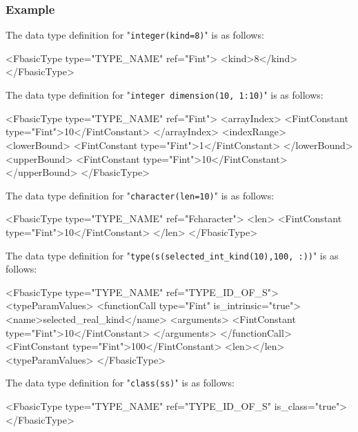 \subsubsection*{Example}

The data type definition for "{\tt integer(kind=8)}" is as follows:
\vspace{2mm}

\begin{XcodeMLFExample}
<FbasicType type="TYPE_NAME" ref="Fint">
  <kind>8</kind>
</FbasicType>
\end{XcodeMLFExample}

The data type definition for "{\tt integer dimension(10, 1:10)}" is as follows:
\vspace{2mm}

\begin{XcodeMLFExample}
<FbasicType type="TYPE_NAME" ref="Fint">
  <arrayIndex>
    <FintConstant type="Fint">10</FintConstant>
  </arrayIndex>
  <indexRange>
    <lowerBound>
      <FintConstant type="Fint">1</FintConstant>
    </lowerBound>
  <upperBound>
      <FintConstant type="Fint">10</FintConstant>
  </upperBound>
</FbasicType>
\end{XcodeMLFExample}

The data type definition for "{\tt character(len=10)}" is as follows:
\vspace{2mm}

\begin{XcodeMLFExample}
<FbasicType type="TYPE_NAME" ref="Fcharacter">
  <len>
    <FintConstant type="Fint">10</FintConstant>
  </len>
</FbasicType>
\end{XcodeMLFExample}

The data type definition for "{\tt type(s(selected\_int\_kind(10),100, :))}" is as follows:
\vspace{2mm}

\begin{XcodeMLFExample}
<FbasicType type="TYPE_NAME" ref="TYPE_ID_OF_S">
<typeParamValues>
  <functionCall type="Fint" is_intrinsic="true">
    <name>selected_real_kind</name>
    <arguments>
       <FintConstant type="Fint">10</FintConstant>
    </arguments>
  </functionCall>
  <FintConstant type="Fint">100</FintConstant>
  <len></len>
  <typeParamValues>
</FbasicType>
\end{XcodeMLFExample}

The data type definition for "{\tt class(ss)}" is as follows:
\vspace{2mm}

\begin{XcodeMLFExample}
<FbasicType type="TYPE_NAME" ref="TYPE_ID_OF_S" is_class="true">
</FbasicType>
\end{XcodeMLFExample}

